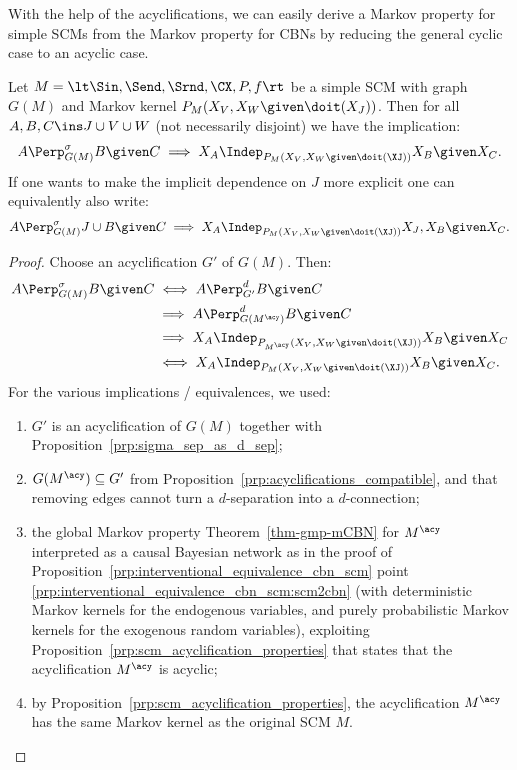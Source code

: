 With the help of the acyclifications,
we can easily derive a Markov property for simple SCMs from the Markov property for CBNs by reducing
the general cyclic case to an acyclic case.
\begin{Cor}\label{cor:gmp_simple_scm}
  Let $M = \lt \Sin, \Send, \Srnd, \CX, P, f \rt$ be a simple SCM with graph $G(M)$
  and Markov kernel $P_{M}(X_V,X_W \given \doit(X_J))$.
  Then for all $A, B, C \ins J \cup V \cup W$ (not necessarily disjoint) we have the implication:
  $$A \Perp^\sigma_{G(M)} B \given C \implies X_A \Indep_{P_{M}(X_V,X_W \given \doit(\XJ))} X_B \given X_C.$$
  If one wants to make the implicit dependence on $J$ more explicit one can equivalently also write:
  $$A \Perp^\sigma_{G(M)} J \cup B \given C \implies X_A \Indep_{P_{M}(X_V,X_W \given \doit(\XJ))} X_J,X_B \given X_C.$$
\end{Cor}
\begin{proof}
  Choose an acyclification $G'$ of $G(M)$. Then:
  \begin{equation*}\begin{split}
    A \Perp^\sigma_{G(M)} B \given C 
    & \iff A \Perp^d_{G'} B \given C \\
    & \implies A \Perp^d_{G(M^\acy)} B \given C \\
    & \implies X_A \Indep_{P_{M^\acy}(X_V,X_W \given \doit(\XJ))} X_B \given X_C \\
    & \iff X_A \Indep_{P_{M}(X_V,X_W \given \doit(\XJ))} X_B \given X_C.
  \end{split}\end{equation*}
  For the various implications / equivalences, we used:
  \begin{enumerate}
    \item $G'$ is an acyclification of $G(M)$ together with Proposition~\ref{prp:sigma_sep_as_d_sep}; 
    \item $G(M^\acy) \subseteq G'$ from Proposition~\ref{prp:acyclifications_compatible}, and that removing edges cannot turn a $d$-separation into a $d$-connection; 
    \item the global Markov property Theorem~\ref{thm-gmp-mCBN} for $M^\acy$ interpreted as a causal Bayesian network as in the proof of Proposition~\ref{prp:interventional_equivalence_cbn_scm} point \ref{prp:interventional_equivalence_cbn_scm:scm2cbn} (with deterministic Markov kernels for the endogenous variables, and purely probabilistic Markov kernels for the exogenous random variables), exploiting Proposition~\ref{prp:scm_acyclification_properties} that states that the acyclification $M^\acy$ is acyclic;
    \item by Proposition~\ref{prp:scm_acyclification_properties}, the acyclification $M^\acy$ has the same Markov kernel as the original SCM $M$.
  \end{enumerate}
\end{proof}
